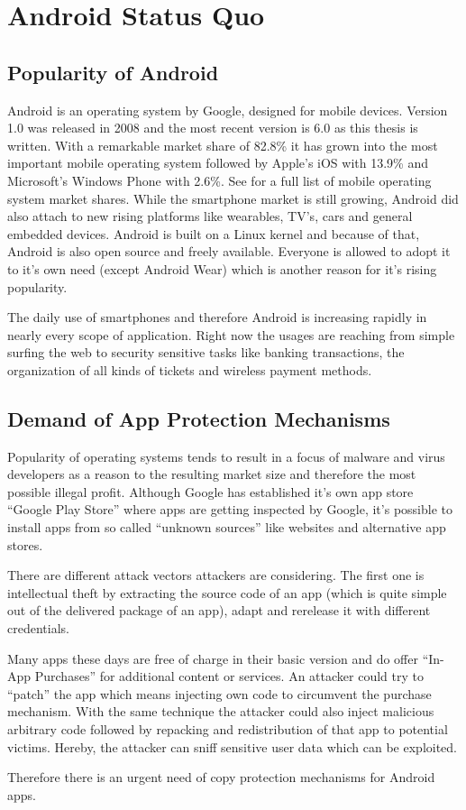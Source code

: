 \chapter{Android Status Quo}\label{chapter:android_status_quo}

\section{Popularity of Android}
Android is an operating system by Google,
designed for mobile devices. Version 1.0 was released
in 2008 and the most recent version is 6.0 as this thesis
is written. With a remarkable market share of 82.8\%
it has grown into the most important mobile operating system
followed by Apple's iOS with 13.9\% and Microsoft's Windows
Phone with 2.6\%. See \parencite{marketshare} for a full list
of mobile operating system market shares. While the smartphone
market is still growing, Android did also attach to new
rising platforms like wearables, TV's, cars and general
embedded devices. Android is built on a Linux kernel
and because of that, Android is also open source and freely
available. Everyone is allowed to adopt it to it's own need
(except Android Wear) which is another reason for it's
rising popularity.

The daily use of smartphones and therefore Android is increasing
rapidly in nearly every scope of application. Right now the usages
are reaching from simple surfing the web to security sensitive tasks
like banking transactions, the organization of all kinds of tickets
and wireless payment methods.

\section{Demand of App Protection Mechanisms}
Popularity of operating systems tends to result in a focus of
malware and virus developers as a reason to the resulting market
size and therefore the most possible illegal profit.
Although Google has established it's own app store
``Google Play Store'' where apps are getting inspected by Google,
it's possible to install apps from so called ``unknown sources''
like websites and alternative app stores.

There are different attack vectors attackers are considering.
The first one is intellectual theft by extracting the source
code of an app (which is quite simple out of the delivered
package of an app), adapt and rerelease it with different credentials.


Many apps these days are free of charge in their basic version and
do offer ``In-App Purchases'' for additional content or services.
An attacker could try to ``patch'' the app which means
injecting own code to circumvent the purchase mechanism.
With the same technique the attacker could also inject malicious
arbitrary code followed by repacking and redistribution of that
app to potential victims. Hereby, the attacker can sniff
sensitive user data which can be exploited.

Therefore there is an urgent need of copy protection mechanisms
for Android apps.
